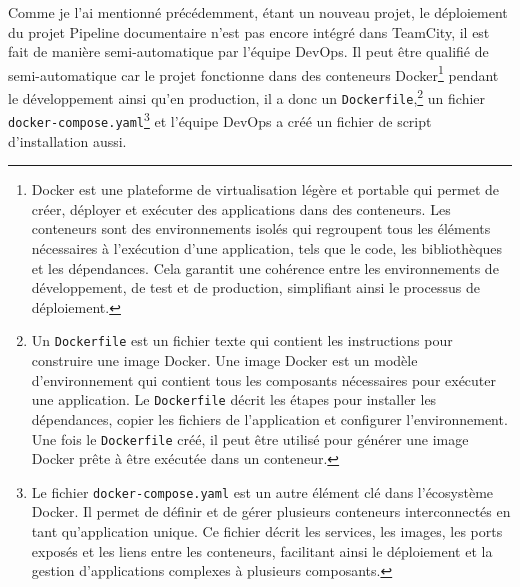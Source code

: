 Comme je l'ai mentionné précédemment, étant un nouveau projet, le déploiement du projet Pipeline documentaire n'est pas encore intégré dans TeamCity, il est fait de manière semi-automatique par l'équipe DevOps. Il peut être qualifié de semi-automatique car le projet fonctionne dans des conteneurs Docker\footnote{Docker est une plateforme de virtualisation légère et portable qui permet de créer, déployer et exécuter des applications dans des conteneurs. Les conteneurs sont des environnements isolés qui regroupent tous les éléments nécessaires à l'exécution d'une application, tels que le code, les bibliothèques et les dépendances. Cela garantit une cohérence entre les environnements de développement, de test et de production, simplifiant ainsi le processus de déploiement.} pendant le développement ainsi qu'en production, il a donc un \texttt{Dockerfile},\footnote{Un \texttt{Dockerfile} est un fichier texte qui contient les instructions pour construire une image Docker. Une image Docker est un modèle d'environnement qui contient tous les composants nécessaires pour exécuter une application. Le \texttt{Dockerfile} décrit les étapes pour installer les dépendances, copier les fichiers de l'application et configurer l'environnement. Une fois le \texttt{Dockerfile} créé, il peut être utilisé pour générer une image Docker prête à être exécutée dans un conteneur.} un fichier \texttt{docker-compose.yaml}\footnote{Le fichier \texttt{docker-compose.yaml} est un autre élément clé dans l'écosystème Docker. Il permet de définir et de gérer plusieurs conteneurs interconnectés en tant qu'application unique. Ce fichier décrit les services, les images, les ports exposés et les liens entre les conteneurs, facilitant ainsi le déploiement et la gestion d'applications complexes à plusieurs composants.} et l'équipe DevOps a créé un fichier de script d'installation aussi.